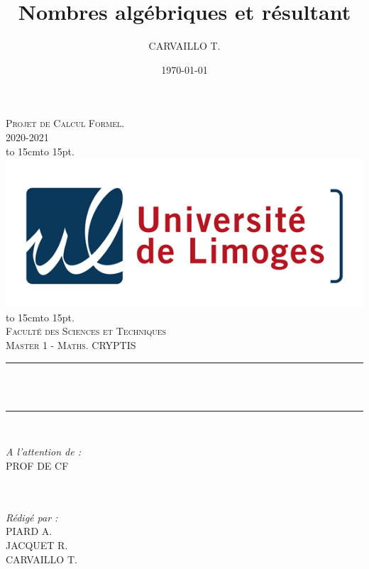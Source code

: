\documentclass[12pt]{article}
\title{Nombres algébriques et résultant}
\author{CARVAILLO T.}
\date{\today}
\makeatletter
\let\thetitle\@title
\def\dotfill#1{\cleaders\hbox to #1{.}\hfill}
\newcommand\dotline[2][.5em]{\leavevmode\hbox to #2{\dotfill{#1}\hfil}}
\theoremstyle{definition}\newtheorem{defn}{Définition}
\theoremstyle{definition}\newtheorem{exm}{Exemple}
\theoremstyle{definition}\newtheorem{rem}{Remarque}
\theoremstyle{definition}\newtheorem{algo}{Algorithme}
\theoremstyle{remark}\newtheorem{exo}{Exercice}
\theoremstyle{remark}\newtheorem{nota}{Notation}
\makeatother
\begin{document}

\begin{titlepage}
	\centering
    \vspace*{0.5 cm}
    \textsc{\LARGE Projet de Calcul Formel.\\
    \vspace{12pt}
2020-2021}\\[1.0 cm]
    \dotline[15pt]{15cm}\\
	\includegraphics[scale = 2.2]{logo.png}
	\dotline[15pt]{15cm}\\
	\vspace{1.5cm}
	\textsc{\Large Faculté des Sciences et Techniques}\\
	\textsc{\large Master 1 - Maths. CRYPTIS}\\[1.0 cm]
	\rule{\linewidth}{0.2 mm} \\[0.4 cm]
	{ \huge \bfseries \color{blue} \thetitle}\\
	\rule{\linewidth}{0.2 mm} \\[1.5 cm]
	
	\begin{minipage}{0.4\textwidth}
		\begin{flushleft} \large
			\emph{A l'attention de :}\\
			PROF DE CF\\
			\phantom{a}\\
			\phantom{a}\\
		\end{flushleft}
	\end{minipage}
	\begin{minipage}{0.5\textwidth}
    	\begin{flushright} \large
		\emph{Rédigé par :}\\
		PIARD A.\\
		JACQUET R.\\
		CARVAILLO T.\\
		\end{flushright}
	\end{minipage}\\[2 cm]
\end{titlepage}
\end{document}
